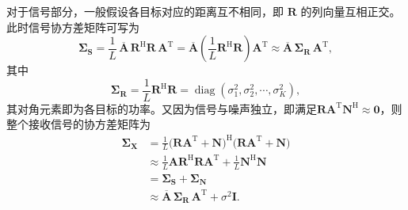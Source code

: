 对于信号部分，一般假设各目标对应的距离互不相同，即 \(\mathbf{R}\) 的列向量互相正交。此时信号协方差矩阵可写为
\[
    \mathbf{\Sigma}_{\mathbf{S}}
    = \frac{1}{L}\,\overline{\mathbf{A}}\,\mathbf{R}^{\mathrm{H}}\mathbf{R}\,\mathbf{A}^{\mathrm{T}}
    = \overline{\mathbf{A}}
    \left(\frac{1}{L}\mathbf{R}^{\mathrm{H}}\mathbf{R}\right)
    \mathbf{A}^{\mathrm{T}}
    \approx \overline{\mathbf{A}}\,\mathbf{\Sigma}_{\mathbf{R}}\,\mathbf{A}^{\mathrm{T}},
\]
其中
\[
    \mathbf{\Sigma}_{\mathbf{R}}
    = \frac{1}{L}\mathbf{R}^{\mathrm{H}}\mathbf{R}
    = \operatorname{diag}(\sigma_1^2,\sigma_2^2,\cdots,\sigma_K^2),
\]
其对角元素即为各目标的功率。又因为信号与噪声独立，即满足\(\mathbf{R}\mathbf{A}^{\mathrm{T}}\mathbf{N}^{\mathrm{H}} \approx \mathbf{0}\)，则整个接收信号的协方差矩阵为
\[
    \begin{split}
        \mathbf{\Sigma}_{\mathbf{X}}
         & = \frac{1}{L}\big(\mathbf{R}\mathbf{A}^{\mathrm{T}}+\mathbf{N}\big)^{\mathrm{H}}
        \big(\mathbf{R}\mathbf{A}^{\mathrm{T}}+\mathbf{N}\big)                                   \\
         & \approx \frac{1}{L}\mathbf{A}\mathbf{R}^{\mathrm{H}}\mathbf{R}\mathbf{A}^{\mathrm{T}}
        + \frac{1}{L}\mathbf{N}^{\mathrm{H}}\mathbf{N}                                           \\
         & = \mathbf{\Sigma}_{\mathbf{S}} + \mathbf{\Sigma}_{\mathbf{N}}                         \\
         & \approx \overline{\mathbf{A}}\,\mathbf{\Sigma}_{\mathbf{R}}\,\mathbf{A}^{\mathrm{T}}
        + \sigma^2 \mathbf{I}.
    \end{split}
\]

